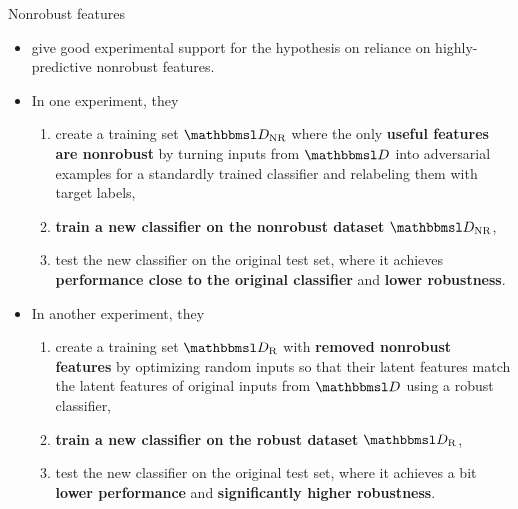 \documentclass{beamer}
\newcommand{\citet}[1]{{\color{citecolor}\relscale{0.8}\textcite{#1}}}
\newcommand{\citep}[1]{{\color{citecolor}\relscale{0.8}[\textcite{#1}]}}
\begin{document}
\begin{frame}[allowframebreaks=0.9]{Nonrobust features}
	\begin{itemize}
		\item \citet{Ilyas:2019:AENBTF} give good experimental support for the hypothesis on reliance on highly-predictive nonrobust features.
		\item In one experiment, they
		\begin{enumerate}
			\item create a training set $\set D_\text{NR}$ where the only \textbf{useful features are nonrobust} by turning inputs from $\set D$ into adversarial examples for a standardly trained classifier and relabeling them with target labels,
			\item \textbf{train a new classifier on the nonrobust dataset} $\set D_\text{NR}$,
			\item test the new classifier on the original test set, where it achieves \textbf{performance close to the original classifier} and \textbf{lower robustness}.
		\end{enumerate}		
		\item In another experiment, they
		\begin{enumerate}
			\item create a training set $\set D_\text{R}$ with \textbf{removed nonrobust features} by optimizing random inputs so that their latent features match the latent features of original inputs from $\set D$ using a robust classifier,
			\item \textbf{train a new classifier on the robust dataset} $\set D_\text{R}$,
			\item test the new classifier on the original test set, where it achieves a bit \textbf{lower performance} and \textbf{significantly higher robustness}.
		\end{enumerate}

\end{itemize}
\end{frame}
\end{document}
